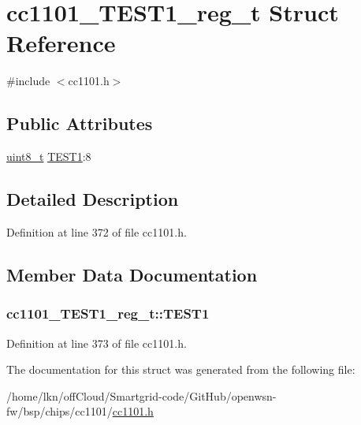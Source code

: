 \hypertarget{structcc1101___t_e_s_t1__reg__t}{}\section{cc1101\+\_\+\+T\+E\+S\+T1\+\_\+reg\+\_\+t Struct Reference}
\label{structcc1101___t_e_s_t1__reg__t}


{\ttfamily \#include $<$cc1101.\+h$>$}

\subsection*{Public Attributes}
\begin{DoxyCompactItemize}
\item 
\hyperlink{_p_e___types_8h_aba7bc1797add20fe3efdf37ced1182c5}{uint8\+\_\+t} \hyperlink{structcc1101___t_e_s_t1__reg__t_a017b0fe919ab8d6158884c0f30846b83}{T\+E\+S\+T1}\+:8
\end{DoxyCompactItemize}


\subsection{Detailed Description}


Definition at line 372 of file cc1101.\+h.



\subsection{Member Data Documentation}
\subsubsection[{\texorpdfstring{T\+E\+S\+T1}{TEST1}}]{ cc1101\+\_\+\+T\+E\+S\+T1\+\_\+reg\+\_\+t\+::\+T\+E\+S\+T1}\hypertarget{structcc1101___t_e_s_t1__reg__t_a017b0fe919ab8d6158884c0f30846b83}{}\label{structcc1101___t_e_s_t1__reg__t_a017b0fe919ab8d6158884c0f30846b83}


Definition at line 373 of file cc1101.\+h.



The documentation for this struct was generated from the following file\+:\begin{DoxyCompactItemize}
\item 
/home/lkn/off\+Cloud/\+Smartgrid-\/code/\+Git\+Hub/openwsn-\/fw/bsp/chips/cc1101/\hyperlink{cc1101_8h}{cc1101.\+h}\end{DoxyCompactItemize}
